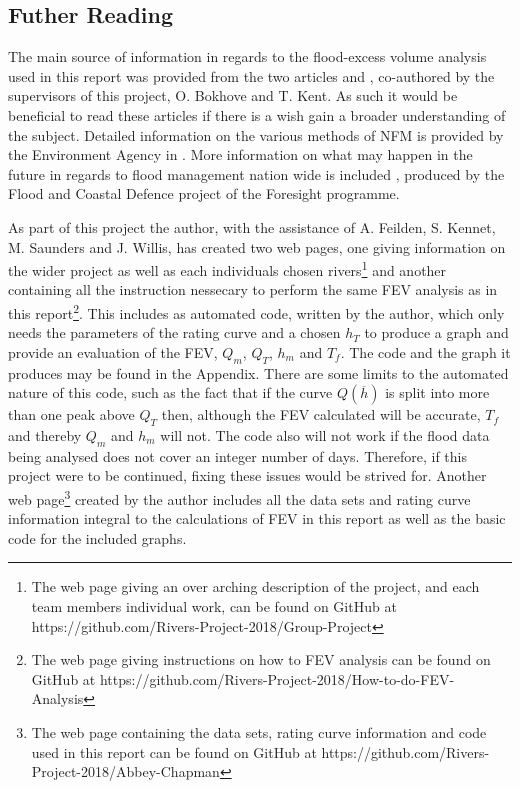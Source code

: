 \documentclass[11pt,a4paper]{article}
\begin{document}
\subsection{Futher Reading}
The main source of information in regards to the flood-excess volume analysis used in this report was provided from the two articles \cite{Aire} and \cite{Calder-Don}, co-authored by the supervisors of this project, O. Bokhove and T. Kent. As such it would be beneficial to read these articles if there is a wish gain a broader understanding of the subject. Detailed information on the various methods of NFM is provided by the Environment Agency in \cite{nfm}. More information on what may happen in the future in regards to flood management nation wide is included \cite{foresight}, produced by the Flood and Coastal Defence project of the Foresight programme.

As part of this project the author, with the assistance of A. Feilden, S. Kennet, M. Saunders and J. Willis, has created two web pages, one giving information on the wider project as well as each individuals chosen rivers\footnote{The web page giving an over arching description of the project, and each team members individual work, can be found on GitHub at https://github.com/Rivers-Project-2018/Group-Project} and another  containing all the instruction nessecary to perform the same FEV analysis as in this report\footnote{The web page giving instructions on how to FEV analysis can be found on GitHub at https://github.com/Rivers-Project-2018/How-to-do-FEV-Analysis}. This includes as automated code, written by the author, which only needs the parameters of the rating curve and a chosen $h_T$ to produce a graph and provide an evaluation of the FEV, $Q_m$, $Q_T$, $h_m$ and $T_f$. The code and the graph it produces may be found in the Appendix. There are some limits to the automated nature of this code, such as the fact that if the curve $Q(\overline{h})$ is split into more than one peak above $Q_T$ then, although the FEV calculated will be accurate, $T_f$ and thereby $Q_m$ and $h_m$ will not. The code also will not work if the flood data being analysed does not cover an integer number of days. Therefore, if this project were to be continued, fixing these issues would be strived for. Another web page\footnote{The web page containing the data sets, rating curve information and code used in this report can be found on GitHub at https://github.com/Rivers-Project-2018/Abbey-Chapman} created by the author includes all the data sets and rating curve information integral to the calculations of FEV in this report as well as the basic code for the included graphs.
\end{document}
